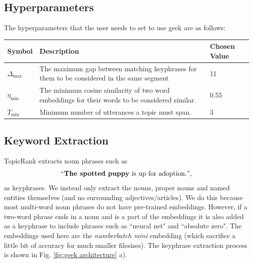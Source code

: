     \subsection{Hyperparameters}
    The hyperparameters that the user needs to set to use \gls{geek} are as follows:

    \begin{table}[h]
        \centering
        \begin{tabularx}{0.9\textwidth}{| t | b | t |}
        \hline
        \textbf{Symbol} & \textbf{Description} & \textbf{Chosen Value} \\ \hline
        $\Delta_{\text{max}}$     & The maximum gap between matching \glspl{keyphrase} for them to be considered in the same segment & 11                    \\ \hline
        $\eta_{\text{min}}$     & The minimum cosine similarity of two word \glspl{embedding} for their words to be considered similar. & 0.55                        \\ \hline
        $T_{\text{min}}$ & Minimum number of \glspl{utterance} a topic must span. & 3 \\ \hline

        \end{tabularx}
    \end{table}
    

    \subsection{Keyword Extraction}
        TopicRank extracts noun phrases such as
        \begin{equation*}
            ``\textbf{The spotted puppy}\text{ is up for adoption.}",
        \end{equation*}
        as \glspl{keyphrase}. We instead only extract the nouns, proper nouns and named entities themselves (and no surrounding adjectives/articles). We do this because most multi-word noun phrases do not have pre-trained \glspl{embedding}. However, if a two-word phrase ends in a noun and is a part of the \glspl{embedding} it is also added as a \gls{keyphrase} to include phrases such as ``neural net" and ``absolute zero". The \glspl{embedding} used here are the \textit{\gls{numberbatch} mini} \gls{embedding} (which sacrifice a little bit of accuracy for much smaller filesizes). The \gls{keyphrase} extraction process is shown in Fig. \ref{fig:geek architecture} a).

